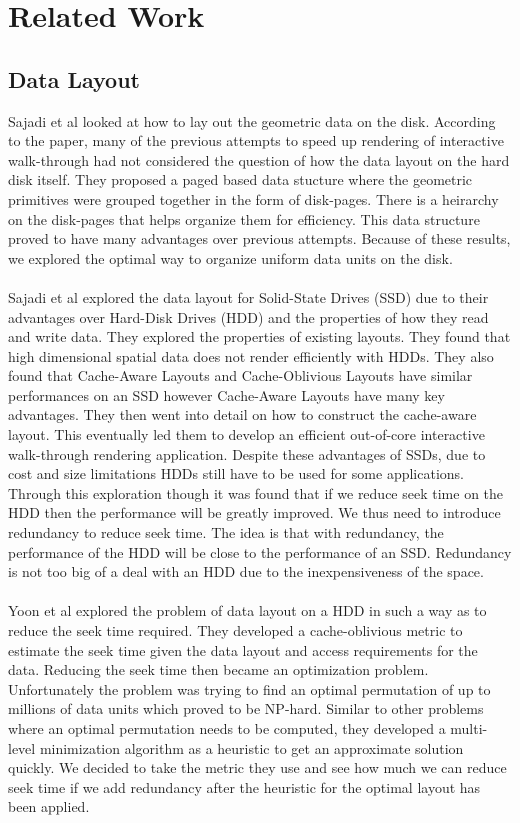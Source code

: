 \documentclass[11pt,psfig]{article}
\begin{document}
\newpage

\section*{Related Work}

\subsection*{Data Layout}

Sajadi et al \cite{pagebased} looked at how to lay out the geometric data on the disk. According to the paper, many of the previous attempts to speed up rendering of interactive walk-through had not considered the question of how the data layout on the hard disk itself. They proposed a paged based data stucture where the geometric primitives were grouped together in the form of disk-pages. There is a heirarchy on the disk-pages that helps organize them for efficiency. This data structure proved to have many advantages over previous attempts. Because of these results, we explored the optimal way to organize uniform data units on the disk. \\
\\
Sajadi et al \cite{ssdpaper} explored the data layout for Solid-State Drives (SSD) due to their advantages over Hard-Disk Drives (HDD) and the properties of how they read and write data. They explored the properties of existing layouts. They found that high dimensional spatial data does not render efficiently with HDDs. They also found that Cache-Aware Layouts and Cache-Oblivious Layouts have similar performances on an SSD however Cache-Aware Layouts have many key advantages. They then went into detail on how to construct the cache-aware layout. This eventually led them to develop an efficient out-of-core interactive walk-through rendering application. Despite these advantages of SSDs, due to cost and size limitations HDDs still have to be used for some applications. Through this exploration though it was found that if we reduce seek time on the HDD then the performance will be greatly improved. We thus need to introduce redundancy to reduce seek time. The idea is that with redundancy, the performance of the HDD will be close to the performance of an SSD. Redundancy is not too big of a deal with an HDD due to the inexpensiveness of the space.\\
\\
Yoon et al \cite{cacheobliviouslayout} explored the problem of data layout on a HDD in such a way as to reduce the seek time required. They developed a cache-oblivious metric to estimate the seek time given the data layout and access requirements for the data. Reducing the seek time then became an optimization problem. Unfortunately the problem was trying to find an optimal permutation of up to millions of data units which proved to be NP-hard. Similar to other problems where an optimal permutation needs to be computed, they developed a multi-level minimization algorithm as a heuristic to get an approximate solution quickly. We decided to take the metric they use and see how much we can reduce seek time if we add redundancy after the heuristic for the optimal layout has been applied.
\end{document}
